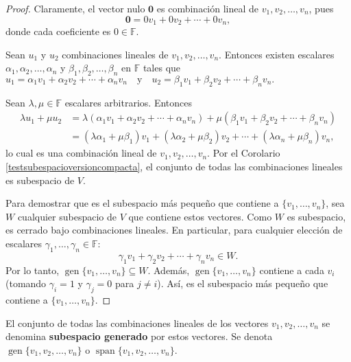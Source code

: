 \begin{proof}
Claramente, el vector nulo $\mathbf{0}$ es combinación lineal de $v_1,v_2,\dots, v_n$, pues  \[ \mathbf{0} = 0v_1 + 0v_2 + \cdots + 0v_n,\] donde cada coeficiente es $0 \in \mathbb{F}$. 

Sean $u_1$ y $u_2$ combinaciones lineales de $v_1,v_2,\dots, v_n$. Entonces existen escalares $\alpha_1,\alpha_2,\dots,\alpha_n$ y $\beta_1,\beta_2,\dots,\beta_n$ en $\mathbb{F}$ tales que \(
u_1 = \alpha_1 v_1 + \alpha_2 v_2 + \cdots + \alpha_n v_n \quad \text{y} \quad u_2 = \beta_1 v_1 + \beta_2 v_2 + \cdots + \beta_n v_n.
\)

Sean $\lambda, \mu \in \mathbb{F}$ escalares arbitrarios. Entonces
\begin{align*}
\lambda u_1 + \mu u_2 &= \lambda \left( \alpha_1 v_1 + \alpha_2 v_2 + \cdots + \alpha_n v_n \right) + \mu \left( \beta_1 v_1 + \beta_2 v_2 + \cdots + \beta_n v_n \right) \\
&= (\lambda \alpha_1 + \mu \beta_1)v_1 + (\lambda \alpha_2 + \mu \beta_2)v_2 + \cdots + (\lambda \alpha_n + \mu \beta_n)v_n,
\end{align*}
lo cual es una combinación lineal de $v_1,v_2,\dots, v_n$. Por el Corolario \ref{testsubespacioversioncompacta}, el conjunto de todas las combinaciones lineales es subespacio de $V$.

Para demostrar que es el subespacio más pequeño que contiene a $\{v_1,\dots,v_n\}$, sea $W$ cualquier subespacio de $V$ que contiene estos vectores. Como $W$ es subespacio, es cerrado bajo combinaciones lineales. En particular, para cualquier elección de escalares $\gamma_1,\dots,\gamma_n \in \mathbb{F}$: 
\[
\gamma_1v_1 + \gamma_2v_2 + \cdots + \gamma_nv_n \in W.
\]
Por lo tanto, $\operatorname{gen}\{v_1,\dots,v_n\} \subseteq W$. Además, $\operatorname{gen}\{v_1,\dots,v_n\}$ contiene a cada $v_i$ (tomando $\gamma_i=1$ y $\gamma_j=0$ para $j\neq i$). Así, es el subespacio más pequeño que contiene a $\{v_1,\dots,v_n\}$.
\end{proof}

\begin{definition} \label{defgenerado} 
El conjunto de todas las combinaciones lineales de los vectores $v_1,v_2,\dots, v_n$ se denomina \textbf{subespacio generado} por estos vectores. Se denota $\operatorname{gen}\{v_1,v_2,\dots, v_n\}$ o $\operatorname{span}\{v_1,v_2,\dots, v_n\}$.
\end{definition}

